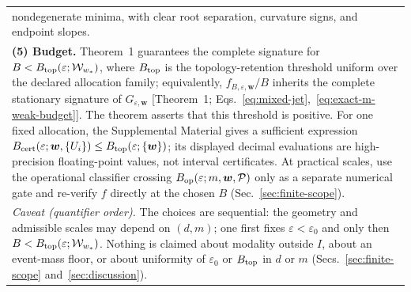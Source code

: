 \begin{table}[!t]
\begin{ruledtabular}
\begin{tabular}{p{}}
nondegenerate minima, with clear root separation, curvature signs, and
endpoint slopes.\\[3pt]
\textbf{(5) Budget.}  Theorem~1 guarantees the complete signature for
$B<B_{\rm top}(\varepsilon;\mathcal W_{w_*})$, where $B_{\rm top}$ is the
topology-retention threshold uniform over the declared allocation
family; equivalently, $f_{B,\varepsilon,\bm w}/B$ inherits the complete
stationary signature
of $G_{\varepsilon,\bm w}$ [Theorem~1;
Eqs.~\eqref{eq:mixed-jet},~\eqref{eq:exact-m-weak-budget}].  The
theorem asserts that this threshold is positive.  For one fixed allocation,
the Supplemental Material gives a sufficient expression
$B_{\rm cert}(\varepsilon;\bm w,\{U_i\})
\le B_{\rm top}(\varepsilon;\{\bm w\})$; its displayed decimal evaluations
are high-precision floating-point values, not interval certificates.  At
practical scales, use the operational classifier crossing
$B_{\rm op}(\varepsilon;m,\bm w,\mathcal P)$ only as a separate numerical
gate and re-verify $f$ directly at the chosen $B$
(Sec.~\ref{sec:finite-scope}).\\[3pt]
\textit{Caveat (quantifier order).}  The choices are sequential: the
geometry and admissible scales may depend on $(d,m)$; one first fixes
$\varepsilon<\varepsilon_0$ and only then
$B<B_{\rm top}(\varepsilon;\mathcal W_{w_*})$.  Nothing
is claimed about modality outside $I$, about an event-mass floor, or
about uniformity of $\varepsilon_0$ or $B_{\rm top}$ in $d$ or $m$
(Secs.~\ref{sec:finite-scope} and~\ref{sec:discussion}).\\
\end{tabular}
\end{ruledtabular}
\end{table}
